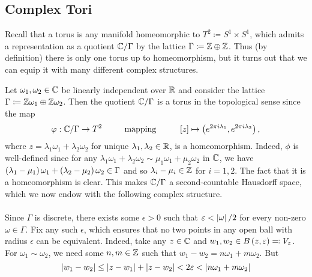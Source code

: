 \documentclass[../Moduli_Spaces_of_Riemann_Surfaces.tex]{subfiles}
\begin{document}
    \subsection{Complex Tori}
    Recall that a torus is any manifold homeomorphic to $T^2\coloneqq S^1\times S^1$, which admits a representation as a quotient $\mathbb{C}/\Gamma$ by the lattice $\Gamma\coloneqq\mathbb{Z}\oplus\mathbb{Z}$. Thus (by definition) there is only one torus up to homeomorphism, but it turns out that we can equip it with many different complex structures.
    \begin{example}\label{1.1:exa:tori}
        Let $\omega_1,\omega_2\in\mathbb{C}$ be linearly independent over $\mathbb{R}$ and consider the lattice $\Gamma\coloneqq\mathbb{Z}\omega_1\oplus\mathbb{Z}\omega_2$. Then the quotient $\mathbb{C}/\Gamma$ is a torus in the topological sense since the map
        \begin{equation*}
            \phi:\C/\Gamma\to T^2\ \ \ \ \ \ \ \ \textrm{mapping}\ \ \ \ \ \ \ \ \l[z\r]\mapsto\tpl{e^{2\pi i\lambda_1},e^{2\pi i\lambda_2}},
        \end{equation*}
        where $z=\lambda_1\omega_1+\lambda_2\omega_2$ for unique $\lambda_1,\lambda_2\in\mathbb{R}$, is a homeomorphism. Indeed, $\phi$ is well-defined since for any $\lambda_1\omega_1+\lambda_2\omega_2\sim\mu_1\omega_1+\mu_2\omega_2$ in $\mathbb{C}$, we have $\left(\lambda_1-\mu_1\right)\omega_1+\left(\lambda_2-\mu_2\right)\omega_2\in\Gamma$ and so $\lambda_i-\mu_i\in\mathbb{Z}$ for $i=1,2$. The fact that it is a homeomorphism is clear. This makes $\mathbb{C}/\Gamma$ a second-countable Hausdorff space, which we now endow with the following complex structure.\\\ \\
        Since $\Gamma$ is discrete, there exists some $\epsilon>0$ such that $\varepsilon<\left|\omega\right|/2$ for every non-zero $\omega\in\Gamma$. Fix any such $\epsilon$, which ensures that no two points in any open ball with radius $\epsilon$ can be equivalent. Indeed, take any $z\in\mathbb{C}$ and $w_1,w_2\in B\left(z,\varepsilon\right)\eqqcolon V_z$. For $\omega_1\sim\omega_2$, we need some $n,m\in\mathbb{Z}$ such that $w_1-w_2=n\omega_1+m\omega_2$. But
        \begin{equation*}
            \l|w_1-w_2\r|\leq\l|z-w_1\r|+\l|z-w_2\r|<2\epsilon<\l|n\omega_1+m\omega_2\r|

\end{equation*}
\end{example}
\end{document}
